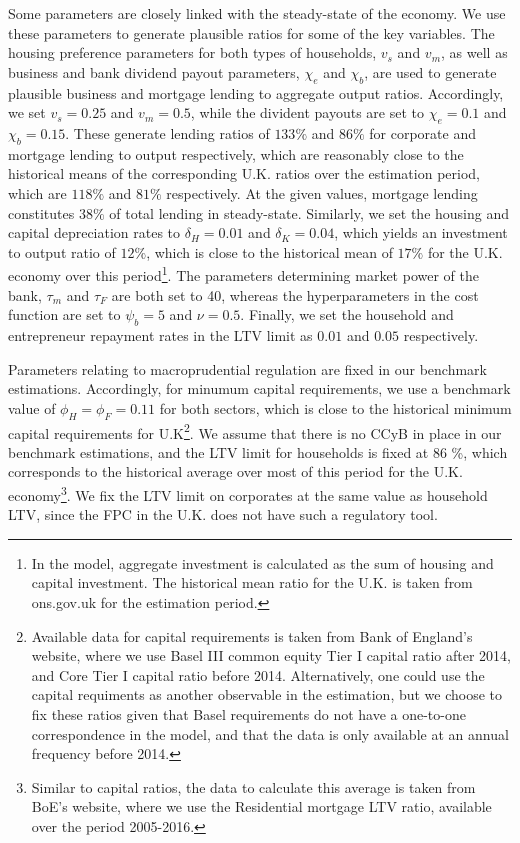 \documentclass[12pt]{article}
\numberwithin{equation}{section}
\begin{document}
Some parameters are closely linked with the steady-state of the economy. We use these parameters to generate plausible ratios for some of the key variables. The housing preference parameters for both types of households, $v_s$ and $v_m$, as well as business and bank dividend payout parameters, $\chi_e$ and $\chi_b$, are used to generate plausible business and mortgage lending to aggregate output ratios.  Accordingly, we set $v_s=0.25$ and $v_m=0.5$, while the divident payouts are set to $\chi_e=0.1$ and $\chi_b=0.15$. These generate lending ratios of $133 \%$ and $86 \%$ for corporate and mortgage lending to output respectively, which are reasonably close to the historical means of the corresponding U.K. ratios over the estimation period, which are $118 \%$ and $81 \%$ respectively. At the given values, mortgage lending constitutes $38 \%$ of total lending in steady-state. Similarly, we set the housing and capital depreciation rates to $\delta_H=0.01$ and $\delta_K=0.04$, which yields an investment to output ratio of $12 \%$, which is close to the historical mean of $17 \%$ for the U.K. economy over this period\footnote{In the model, aggregate investment is calculated as the sum of housing and capital investment. The historical mean ratio for the U.K. is taken from ons.gov.uk for the estimation period.}. The parameters determining market power of the bank, $\tau_m$ and $\tau_F$ are both set to 40, whereas the hyperparameters in the cost function are set to $\psi_b=5$ and $\nu=0.5$. Finally, we set the household and entrepreneur repayment rates in the LTV limit as $0.01$ and $0.05$ respectively. 

Parameters relating to macroprudential regulation are fixed in our benchmark estimations. Accordingly, for minumum capital requirements, we use a benchmark value of $\phi_H=\phi_F=0.11$ for both sectors, which is close to the historical minimum capital requirements for U.K\footnote{Available data for capital requirements is taken from Bank of England's website, where we use Basel III common equity Tier I capital ratio after 2014, and Core Tier I capital ratio before 2014. Alternatively, one could use the capital requiments as another observable in the estimation, but we choose to fix these ratios given that Basel requirements do not have a one-to-one correspondence in the model, and that the data is only available at an annual frequency before 2014.}. We assume that there is no CCyB in place in our benchmark estimations, and the LTV limit for households is fixed at 86 \%, which corresponds to the historical average over most of this period for the U.K. economy\footnote{Similar to capital ratios, the data to calculate this average is taken from BoE's website, where we use the Residential mortgage LTV ratio, available over the period 2005-2016.}. We fix the LTV limit on corporates at the same value as household LTV, since the FPC in the U.K. does not have such a regulatory tool. 
\end{document}
